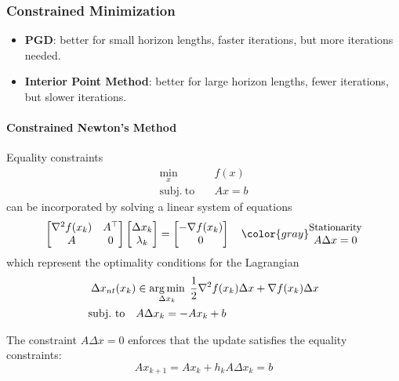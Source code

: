 \subsubsection{Constrained Minimization}
\begin{itemize}
    \item \textbf{PGD}: better for small horizon lengths, faster iterations, but more iterations needed.
    \item \textbf{Interior Point Method}: better for large horizon lengths, fewer iterations, but slower iterations.
\end{itemize}

\paragraph{Constrained Newton's Method}
Equality constraints
\noindent\begin{align*}
    \min_x \quad            & f(x) \\
    \mathrm{subj.\ to}\quad & Ax=b
\end{align*}
can be incorporated by solving a linear system of equations
\begin{equation*}
    \begin{bmatrix}
        \nabla^2 f(x_k) & A^\top \\
        A               & 0
    \end{bmatrix}\begin{bmatrix}
        \Delta x_k \\
        \lambda_k
    \end{bmatrix}
    = \begin{bmatrix}
        -\nabla f(x_k) \\
        0
    \end{bmatrix} \quad {\color{gray}\begin{matrix}
            \text{\small{Stationarity}} \\
            A\Delta x = 0
        \end{matrix}}
\end{equation*}
which represent the optimality conditions for the Lagrangian
\begin{align*}
    \Delta x_{nt}(x_k)       & \in \operatorname*{arg\,min}_{\Delta x_k} \; \frac{1}{2}\nabla^2 f(x_k) \Delta x + \nabla f(x_k)\Delta x \\
    \mathrm{subj.\ to} \quad & A\Delta x_k = -Ax_k + b
\end{align*}

\newpar{}
The constraint $A\Delta x = 0$ enforces that the update satisfies the equality constraints:
\begin{equation*}
    Ax_{k+1} = Ax_k + h_k A\Delta x_k = b
\end{equation*}

